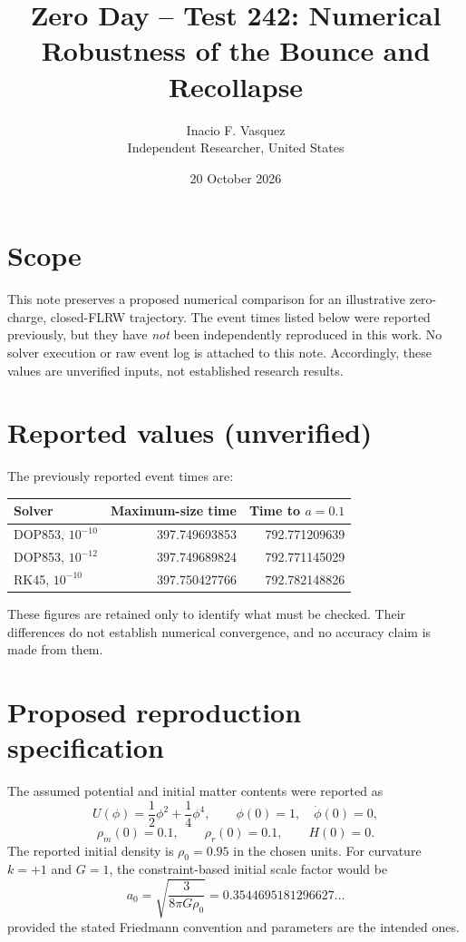 \documentclass[11pt]{article}
\title{Zero Day -- Test 242: Numerical Robustness of the Bounce and Recollapse}
\author{Inacio F. Vasquez\\Independent Researcher, United States}
\date{20 October 2026}
\begin{document}
\maketitle

\section{Scope}
This note preserves a proposed numerical comparison for an illustrative
zero-charge, closed-FLRW trajectory. The event times listed below were
reported previously, but they have \emph{not} been independently reproduced
in this work. No solver execution or raw event log is attached to this note.
Accordingly, these values are unverified inputs, not established research
results.

\section{Reported values (unverified)}
The previously reported event times are:
\begin{center}
\begin{tabular}{lrr}
\toprule
Solver & Maximum-size time & Time to $a=0.1$\\
\midrule
DOP853, $10^{-10}$ & 397.749693853 & 792.771209639\\
DOP853, $10^{-12}$ & 397.749689824 & 792.771145029\\
RK45, $10^{-10}$ & 397.750427766 & 792.782148826\\
\bottomrule
\end{tabular}
\end{center}
These figures are retained only to identify what must be checked. Their
differences do not establish numerical convergence, and no accuracy claim is
made from them.

\section{Proposed reproduction specification}
The assumed potential and initial matter contents were reported as
\[
U(\phi)=\frac12\phi^2+\frac14\phi^4,\qquad
\phi(0)=1,\quad \dot\phi(0)=0,
\]
\[
\rho_m(0)=0.1,\qquad \rho_r(0)=0.1,\qquad H(0)=0.
\]
The reported initial density is $\rho_0=0.95$ in the chosen units. For
curvature $k=+1$ and $G=1$, the constraint-based initial scale factor would be
\[
a_0=\sqrt{\frac{3}{8\pi G\rho_0}}
=0.3544695181296627\ldots
\]
provided the stated Friedmann convention and parameters are the intended ones.
\end{document}
